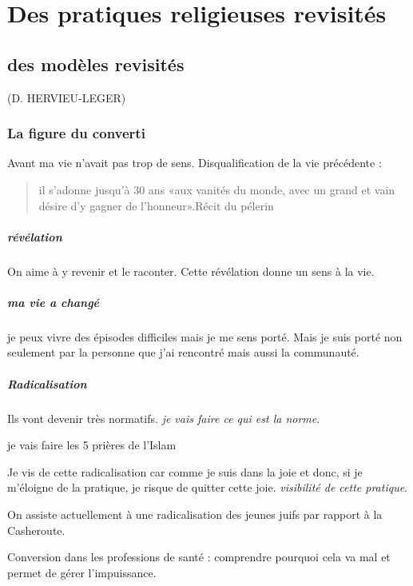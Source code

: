 \chapter{Des pratiques religieuses revisités}

\section{des modèles revisités}
 (D. HERVIEU-LEGER)
\subsection{La figure du converti}
Avant ma vie n'avait pas trop de sens. Disqualification de la vie précédente : 
\begin{quote}
    il s’adonne jusqu’à 30 ans «aux vanités du monde, avec un grand et vain désire d’y gagner de l’honneur».Récit du pélerin
\end{quote}
\paragraph{révélation}
On aime à y revenir et le raconter. Cette révélation donne un sens à la vie.

\paragraph{ma vie a changé} je peux vivre des épisodes difficiles mais je me sens porté. Mais je suis porté non seulement par la personne que j'ai rencontré mais aussi la communauté.

\paragraph{Radicalisation} Ils vont devenir très normatifs. \textit{je vais faire ce qui est la norme}. 
\begin{Ex}
    je vais faire les 5 prières de l'Islam
\end{Ex}
Je vis de cette radicalisation car comme je suis dans la joie et donc, si je m'éloigne de la pratique, je risque de quitter cette joie. \textit{visibilité de cette pratique}.

\begin{Ex}
    On assiste actuellement à une radicalisation des jeunes juifs par rapport à la Casheroute.
\end{Ex}

\begin{Ex}
    Conversion dans les professions de santé : comprendre pourquoi cela va mal et permet de gérer l'impuissance. 
\end{Ex}

